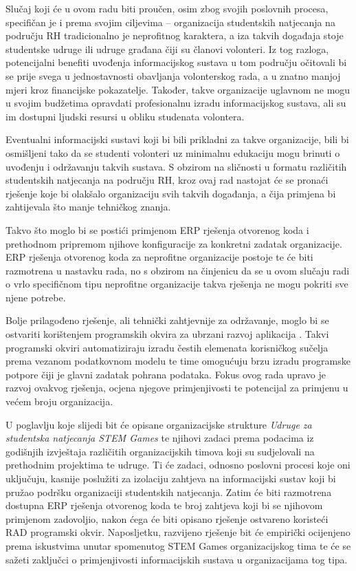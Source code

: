 \documentclass[times, utf8, diplomski]{fer}
\begin{document}
Slučaj koji će u ovom radu biti proučen, osim zbog svojih poslovnih procesa,
specifičan je i prema svojim ciljevima -- organizacija studentskih natjecanja na
području RH tradicionalno je neprofitnog karaktera, a iza takvih događaja stoje
studentske udruge ili udruge građana čiji su članovi volonteri. Iz tog razloga,
potencijalni benefiti uvođenja informacijskog sustava u tom području očitovali
bi se prije svega u jednostavnosti obavljanja volonterskog rada, a u znatno
manjoj mjeri kroz financijske pokazatelje. Također, takve organizacije uglavnom
ne mogu u svojim budžetima opravdati profesionalnu izradu informacijskog
sustava, ali su im dostupni ljudski resursi u obliku studenata volontera.

Eventualni informacijski sustavi koji bi bili prikladni za takve organizacije,
bili bi osmišljeni tako da se studenti volonteri uz minimalnu edukaciju mogu
brinuti o uvođenju i održavanju takvih sustava. S obzirom na sličnosti u formatu
različitih studentskih natjecanja na području RH, kroz ovaj rad nastojat će se
pronaći rješenje koje bi olakšalo organizaciju svih takvih događanja, a čija
primjena bi zahtijevala što manje tehničkog znanja.

Takvo što moglo bi se postići primjenom ERP rješenja otvorenog koda i prethodnom
pripremom njihove konfiguracije za konkretni zadatak organizacije. ERP rješenja
otvorenog koda za neprofitne organizacije postoje te će biti razmotrena u
nastavku rada, no s obzirom na činjenicu da se u ovom slučaju radi o vrlo
specifičnom tipu neprofitne organizacije takva rješenja ne mogu pokriti sve
njene potrebe.

Bolje prilagođeno rješenje, ali tehnički zahtjevnije za održavanje, moglo bi se
ostvariti korištenjem programskih okvira za ubrzani razvoj aplikacija
. Takvi programski okviri automatiziraju izradu čestih elemenata
korisničkog sučelja prema vezanom podatkovnom modelu te time omogućuju brzu
izradu programske potpore čiji je glavni zadatak pohrana podataka. Fokus ovog
rada upravo je razvoj ovakvog rješenja, ocjena njegove primjenjivosti te
potencijal za primjenu u većem broju organizacija.

U poglavlju koje slijedi bit će opisane organizacijske strukture \emph{Udruge za
studentska natjecanja STEM Games} te njihovi zadaci prema podacima iz godišnjih
izvještaja različitih organizacijskih timova koji su sudjelovali na prethodnim
projektima te udruge. Ti će zadaci, odnosno poslovni procesi koje oni uključuju,
kasnije poslužiti za izolaciju zahtjeva na informacijski sustav koji bi pružao
podršku organizaciji studentskih natjecanja. Zatim će biti razmotrena dostupna
ERP rješenja otvorenog koda te broj zahtjeva koji bi se njihovom primjenom
zadovoljio, nakon ćega će biti opisano rješenje ostvareno koristeći RAD
programski okvir. Naposljetku, razvijeno rješenje bit će empirički ocijenjeno
prema iskustvima unutar spomenutog STEM Games organizacijskog tima te će se
sažeti zaključci o primjenjivosti informacijskih sustava u organizacijama tog
tipa.
\end{document}
